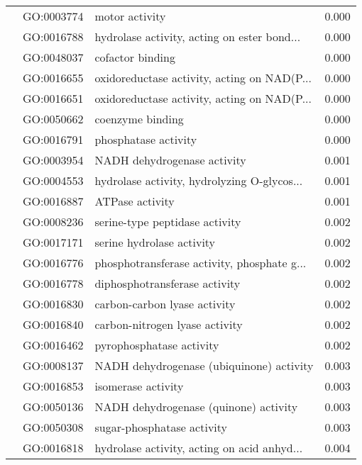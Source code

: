 \begin{longtable}{lllr}
   & GO:0003774 &                               motor activity &         0.000 \\
   & GO:0016788 &  hydrolase activity, acting on ester bond... &         0.000 \\
   & GO:0048037 &                             cofactor binding &         0.000 \\
   & GO:0016655 &  oxidoreductase activity, acting on NAD(P... &         0.000 \\
   & GO:0016651 &  oxidoreductase activity, acting on NAD(P... &         0.000 \\
   & GO:0050662 &                             coenzyme binding &         0.000 \\
   & GO:0016791 &                         phosphatase activity &         0.000 \\
   & GO:0003954 &                  NADH dehydrogenase activity &         0.001 \\
   & GO:0004553 &  hydrolase activity, hydrolyzing O-glycos... &         0.001 \\
   & GO:0016887 &                              ATPase activity &         0.001 \\
   & GO:0008236 &               serine-type peptidase activity &         0.002 \\
   & GO:0017171 &                    serine hydrolase activity &         0.002 \\
   & GO:0016776 &  phosphotransferase activity, phosphate g... &         0.002 \\
   & GO:0016778 &                diphosphotransferase activity &         0.002 \\
   & GO:0016830 &                 carbon-carbon lyase activity &         0.002 \\
   & GO:0016840 &               carbon-nitrogen lyase activity &         0.002 \\
   & GO:0016462 &                     pyrophosphatase activity &         0.002 \\
   & GO:0008137 &     NADH dehydrogenase (ubiquinone) activity &         0.003 \\
   & GO:0016853 &                           isomerase activity &         0.003 \\
   & GO:0050136 &        NADH dehydrogenase (quinone) activity &         0.003 \\
   & GO:0050308 &                   sugar-phosphatase activity &         0.003 \\
   & GO:0016818 &  hydrolase activity, acting on acid anhyd... &         0.004 \\

\end{longtable}
